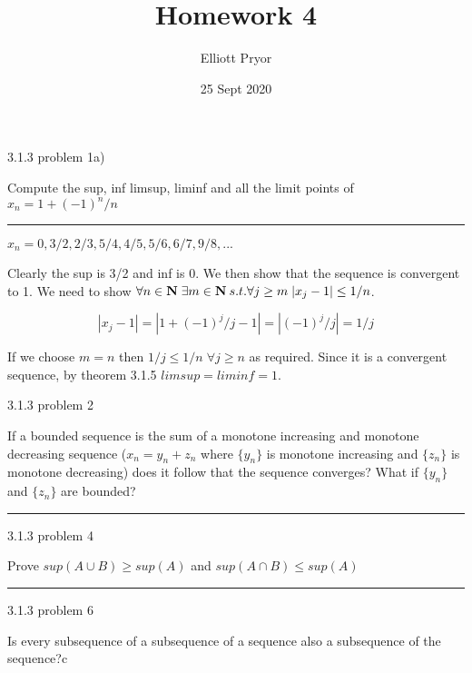 \documentclass[11pt]{article}
\title{Homework 4}
\author{Elliott Pryor}
\date{25 Sept 2020}
\begin{document}
\maketitle



 3.1.3 problem 1a)

Compute the sup, inf limsup, liminf and all the limit points of $x_n = 1 + (-1)^n / n$

\hrule


$x_n = 0, 3/2, 2/3, 5/4, 4/5, 5/6, 6/7, 9/8, ...$

Clearly the sup is 3/2 and inf is 0. 
We then show that the sequence is convergent to 1.
We need to show $\forall n \in \mathbf{N} \; \exists m \in \mathbf{N} \: s.t. \forall j \geq m \; |x_j - 1| \leq 1/n$. 

$$|x_j - 1| = |1 + (-1)^j / j -1| = |(-1)^j/j| = 1/j$$

If we choose $m = n$ then $1/j \leq 1/n \; \forall j \geq n$ as required. Since it is a convergent sequence, by theorem 3.1.5 $limsup = liminf = 1$.



\newpage
{} 3.1.3 problem 2

If a bounded sequence is the sum of a monotone increasing and monotone decreasing sequence ($x_n = y_n + z_n$ where $\{y_n\}$ is monotone increasing and $\{z_n\}$ is monotone decreasing) does it follow that the sequence converges? What if $\{y_n\}$ and $\{z_n\}$ are bounded?

\hrule






\newpage
{} 3.1.3 problem 4

Prove $sup(A \cup B) \geq sup (A)$ and $sup(A\cap B) \leq sup(A)$

\hrule










\newpage
{} 3.1.3 problem 6

Is every subsequence of a subsequence of a sequence also a subsequence of the sequence?c
\end{document}
